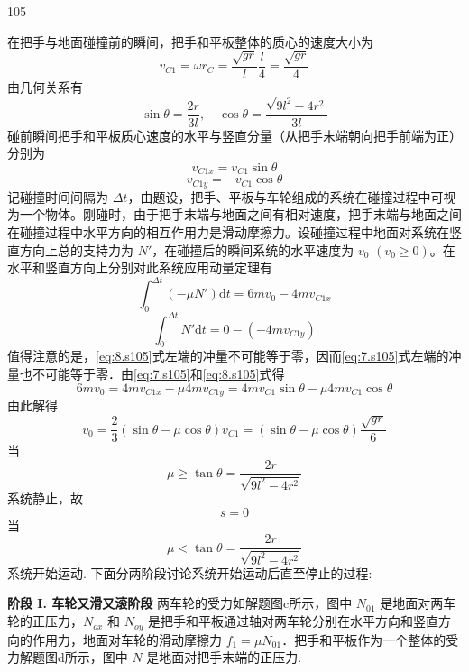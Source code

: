 \begin{solution}{105}
\begin{subsolution}
在把手与地面碰撞前的瞬间，把手和平板整体的质心的速度大小为
\[
v_{C1} = \omega r_{C} = \frac{\sqrt{g r}}{l}\frac{l}{4} = \frac{\sqrt{g r}}{4}
\]
由几何关系有
\[
\sin\theta = \frac{2r}{3l},\quad \cos\theta = \frac{\sqrt{9l^{2} - 4r^{2}}}{3l}
\]
碰前瞬间把手和平板质心速度的水平与竖直分量（从把手末端朝向把手前端为正）分别为
\begin{equation}
v_{C1x} = v_{C1}\sin\theta
\label{eq:5.s105}
\end{equation}
\begin{equation}
v_{C1y} = -v_{C1}\cos\theta
\label{eq:6.s105}
\end{equation}
记碰撞时间间隔为 $\Delta t$，由题设，把手、平板与车轮组成的系统在碰撞过程中可视为一个物体。刚碰时，由于把手末端与地面之间有相对速度，把手末端与地面之间在碰撞过程中水平方向的相互作用力是滑动摩擦力。设碰撞过程中地面对系统在竖直方向上总的支持力为 $N'$，在碰撞后的瞬间系统的水平速度为 $v_{0}$ $(v_{0} \geq 0)$。在水平和竖直方向上分别对此系统应用动量定理有
\begin{equation}
\int_{0}^{\Delta t} (-\mu N') \mathrm{d}t = 6m v_{0} - 4m v_{C1x}
\label{eq:7.s105}
\end{equation}
\begin{equation}
\int_{0}^{\Delta t} N' \mathrm{d}t = 0 - (-4m v_{C1y})
\label{eq:8.s105}
\end{equation}
值得注意的是，\eqref{eq:8.s105}式左端的冲量不可能等于零，因而\eqref{eq:7.s105}式左端的冲量也不可能等于零．由\eqref{eq:7.s105}和\eqref{eq:8.s105}式得
\[
6m v_{0} = 4m v_{C1x} - \mu 4m v_{C1y} = 4m v_{C1}\sin\theta - \mu 4m v_{C1}\cos\theta
\]
由此解得
\[
v_{0} = \frac{2}{3}(\sin\theta - \mu\cos\theta) v_{C1} = (\sin\theta - \mu\cos\theta)\frac{\sqrt{g r}}{6}
\]
当
\[
\mu \geq \tan\theta = \frac{2r}{\sqrt{9l^{2} - 4r^{2}}}
\]
系统静止，故
\[
s = 0
\]
当
\begin{equation}
\mu < \tan\theta = \frac{2r}{\sqrt{9l^{2} - 4r^{2}}}
\label{eq:9.s105}
\end{equation}
系统开始运动. 下面分两阶段讨论系统开始运动后直至停止的过程:

\textbf{阶段 I. 车轮又滑又滚阶段}
两车轮的受力如解题图c所示，图中 $N_{01}$ 是地面对两车轮的正压力，$N_{ox}$ 和 $N_{oy}$ 是把手和平板通过轴对两车轮分别在水平方向和竖直方向的作用力，地面对车轮的滑动摩擦力 $f_{1} = \mu N_{01}$．把手和平板作为一个整体的受力解题图d所示，图中 $N$ 是地面对把手末端的正压力.


\end{subsolution}
\end{solution}
